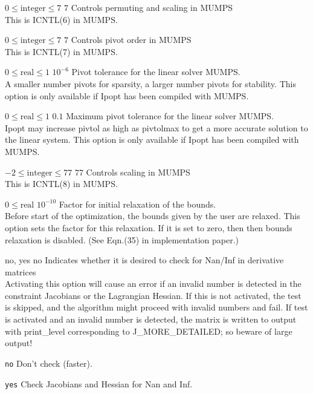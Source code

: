 %
{$0\leq\textrm{integer}\leq7$}%
{$7$}%
{Controls permuting and scaling in MUMPS\\
This is ICNTL(6) in MUMPS.}%
{}

%
{$0\leq\textrm{integer}\leq7$}%
{$7$}%
{Controls pivot order in MUMPS\\
This is ICNTL(7) in MUMPS.}%
{}

%
{$0\leq\textrm{real}\leq1$}%
{$10^{- 6}$}%
{Pivot tolerance for the linear solver MUMPS.\\
A smaller number pivots for sparsity, a larger number pivots for stability.  This option is only available if Ipopt has been compiled with MUMPS.}%
{}

%
{$0\leq\textrm{real}\leq1$}%
{$0.1$}%
{Maximum pivot tolerance for the linear solver MUMPS.\\
Ipopt may increase pivtol as high as pivtolmax to get a more accurate solution to the linear system.  This option is only available if Ipopt has been compiled with MUMPS.}%
{}

%
{$-2\leq\textrm{integer}\leq77$}%
{$77$}%
{Controls scaling in MUMPS\\
This is ICNTL(8) in MUMPS.}%
{}

%
{$0\leq\textrm{real}$}%
{$10^{-10}$}%
{Factor for initial relaxation of the bounds.\\
Before start of the optimization, the bounds given by the user are relaxed.  This option sets the factor for this relaxation.  If it is set to zero, then then bounds relaxation is disabled. (See Eqn.(35) in implementation paper.)}%
{}

%
{\ttfamily no, yes}%
{no}%
{Indicates whether it is desired to check for Nan/Inf in derivative matrices\\
Activating this option will cause an error if an invalid number is detected in the constraint Jacobians or the Lagrangian Hessian.  If this is not activated, the test is skipped, and the algorithm might proceed with invalid numbers and fail.  If test is activated and an invalid number is detected, the matrix is written to output with print\_level corresponding to J\_MORE\_DETAILED; so beware of large output!}%
{\begin{list}{}{
\setlength{\parsep}{0em}
\setlength{\leftmargin}{5ex}
\setlength{\labelwidth}{2ex}
\setlength{\itemindent}{0ex}
\setlength{\topsep}{0pt}}
\item[\texttt{no}] Don't check (faster).
\item[\texttt{yes}] Check Jacobians and Hessian for Nan and Inf.
\end{list}
}

